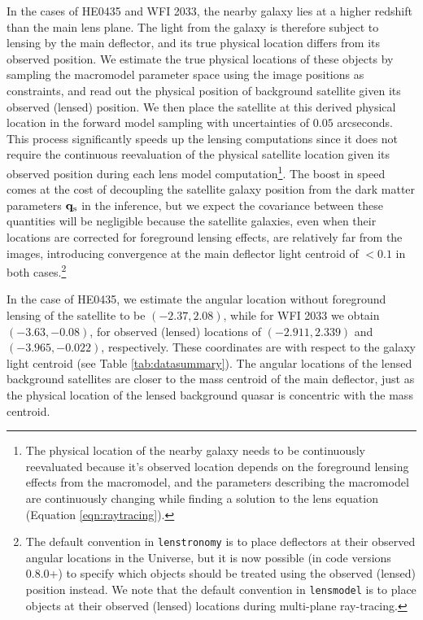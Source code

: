 In the cases of HE0435 and WFI 2033, the nearby galaxy lies at a higher redshift than the main lens plane. The light from the galaxy is therefore subject to lensing by the main deflector, and its true physical location differs from its observed position. We estimate the true physical locations of these objects by sampling the macromodel parameter space using the image positions as constraints, and read out the physical position of background satellite given its observed (lensed) position. We then place the satellite at this derived physical location in the forward model sampling with uncertainties of $0.05$ arcseconds. This process significantly speeds up the lensing computations since it does not require the continuous reevaluation of the physical satellite location given its observed position during each lens model computation\footnote{The physical location of the nearby galaxy needs to be continuously reevaluated because it's observed location depends on the foreground lensing effects from the macromodel, and the parameters describing the macromodel are continuously changing while finding a solution to the lens equation (Equation \ref{eqn:raytracing}).}. The boost in speed comes at the cost of decoupling the satellite galaxy position from the dark matter parameters ${\bf{q}_{\rm{s}}}$ in the inference, but we expect the covariance between these quantities will be negligible because the satellite galaxies, even when their locations are corrected for foreground lensing effects, are relatively far from the images, introducing convergence at the main deflector light centroid of $< 0.1$ in both cases.\footnote{The default convention in {\tt{lenstronomy}} is to place deflectors at their observed angular locations in the Universe, but it is now possible (in code versions 0.8.0+) to specify which objects should be treated using the observed (lensed) position instead. We note that the default convention in {\tt{lensmodel}} \cite{Keeton++97} is to place objects at their observed (lensed) locations during multi-plane ray-tracing.}

In the case of HE0435, we estimate the angular location without foreground lensing of the satellite to be $(-2.37, 2.08)$, while for WFI 2033 we obtain $(-3.63, -0.08)$, for observed (lensed) locations of $(-2.911, 2.339)$ and $(-3.965, -0.022)$, respectively. These coordinates are with respect to the galaxy light centroid (see Table \ref{tab:datasummary}). The angular locations of the lensed background satellites are closer to the mass centroid of the main deflector, just as the physical location of the lensed background quasar is concentric with the mass centroid.  

